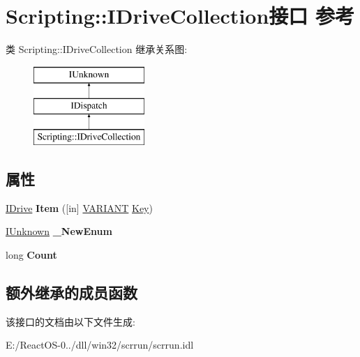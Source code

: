 \hypertarget{interface_scripting_1_1_i_drive_collection}{}\section{Scripting\+:\+:I\+Drive\+Collection接口 参考}
\label{interface_scripting_1_1_i_drive_collection}
类 Scripting\+:\+:I\+Drive\+Collection 继承关系图\+:\begin{figure}[H]
\begin{center}
\leavevmode
\includegraphics[height=3.000000cm]{interface_scripting_1_1_i_drive_collection}
\end{center}
\end{figure}
\subsection*{属性}
\begin{DoxyCompactItemize}
\item 
\mbox{\label{interface_scripting_1_1_i_drive_collection_acc4f708f582214cb4636b74f109c008a}} 
\hyperlink{interface_scripting_1_1_i_drive}{I\+Drive} {\bfseries Item} (\mbox{[}in\mbox{]} \hyperlink{structtag_v_a_r_i_a_n_t}{V\+A\+R\+I\+A\+NT} \hyperlink{struct_key}{Key})
\item 
\mbox{\label{interface_scripting_1_1_i_drive_collection_a673a9cba1addd21908f1605e11c36a25}} 
\hyperlink{interface_i_unknown}{I\+Unknown} {\bfseries \+\_\+\+New\+Enum}
\item 
\mbox{\label{interface_scripting_1_1_i_drive_collection_a9e4cf384aa28fe0c7d3a3f8ae96afd9d}} 
long {\bfseries Count}
\end{DoxyCompactItemize}
\subsection*{额外继承的成员函数}


该接口的文档由以下文件生成\+:\begin{DoxyCompactItemize}
\item 
E\+:/\+React\+O\+S-\/0../dll/win32/scrrun/scrrun.\+idl\end{DoxyCompactItemize}
